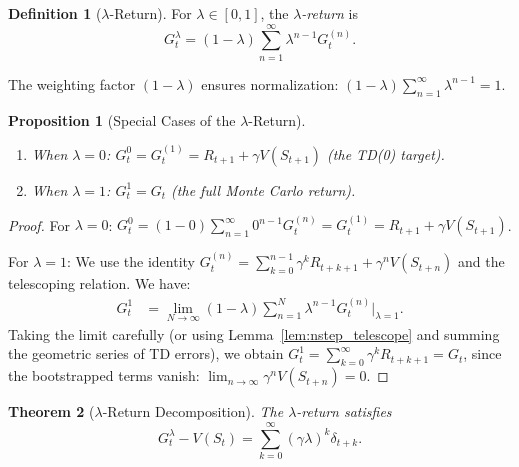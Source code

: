 \documentclass[11pt,a4paper]{article}
\theoremstyle{definition}
\newtheorem{definition}{Definition}[section]
\theoremstyle{plain}
\newtheorem{theorem}{Theorem}[section]
\newtheorem{proposition}[theorem]{Proposition}
\theoremstyle{remark}
\begin{document}
\begin{definition}[$\lambda$-Return]
\label{def:lambda_return}
For $\lambda \in [0,1]$, the \emph{$\lambda$-return} is
\begin{equation}
    G_t^\lambda = (1-\lambda) \sum_{n=1}^{\infty} \lambda^{n-1} G_t^{(n)}.
    \label{eq:lambda_return}
\end{equation}
\end{definition}

The weighting factor $(1-\lambda)$ ensures normalization: $(1-\lambda)\sum_{n=1}^{\infty} \lambda^{n-1} = 1$.

\begin{proposition}[Special Cases of the $\lambda$-Return]
\label{prop:lambda_special}
\begin{enumerate}[nosep]
    \item When $\lambda = 0$: $G_t^0 = G_t^{(1)} = R_{t+1} + \gamma V(S_{t+1})$ (the TD(0) target).
    \item When $\lambda = 1$: $G_t^1 = G_t$ (the full Monte Carlo return).
\end{enumerate}
\end{proposition}

\begin{proof}
For $\lambda = 0$: $G_t^0 = (1-0)\sum_{n=1}^{\infty} 0^{n-1} G_t^{(n)} = G_t^{(1)} = R_{t+1} + \gamma V(S_{t+1})$.

For $\lambda = 1$: We use the identity $G_t^{(n)} = \sum_{k=0}^{n-1} \gamma^k R_{t+k+1} + \gamma^n V(S_{t+n})$ and the telescoping relation. We have:
\begin{align}
    G_t^1 &= \lim_{N \to \infty} (1-\lambda)\sum_{n=1}^{N} \lambda^{n-1} G_t^{(n)} \bigg|_{\lambda=1}. \label{eq:lambda1_limit}
\end{align}
Taking the limit carefully (or using Lemma~\ref{lem:nstep_telescope} and summing the geometric series of TD errors), we obtain $G_t^1 = \sum_{k=0}^{\infty} \gamma^k R_{t+k+1} = G_t$, since the bootstrapped terms vanish: $\lim_{n\to\infty} \gamma^n V(S_{t+n}) = 0$.
\end{proof}

\begin{keyresult}
\begin{theorem}[$\lambda$-Return Decomposition]
\label{thm:lambda_td_errors}
The $\lambda$-return satisfies
\begin{equation}
    G_t^\lambda - V(S_t) = \sum_{k=0}^{\infty} (\gamma\lambda)^k \delta_{t+k}.
    \label{eq:lambda_td_errors}
\end{equation}
\end{theorem}
\end{keyresult}
\end{document}
